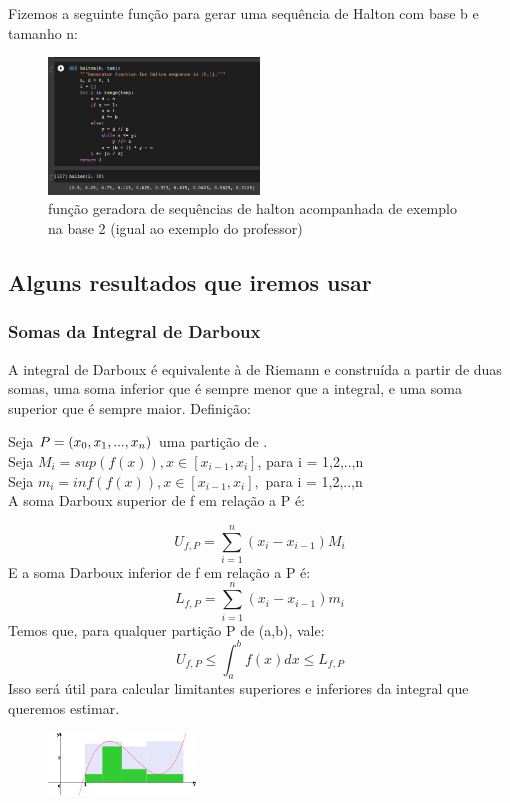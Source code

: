 \documentclass{article}
\begin{document}
Fizemos a seguinte função para gerar uma sequência de Halton com base b e tamanho n:
\begin{figure}[ht]
\centering
\includegraphics[width=0.5\textwidth]{halton_function.png}
\caption{\label{fig:halton_funciton} função geradora de sequências de halton acompanhada de exemplo na base 2 (igual ao exemplo do professor)  }
\end{figure}


\subsection{Alguns resultados que iremos usar}
\subsubsection{Somas da Integral de Darboux}

A integral de Darboux é equivalente à de Riemann e construída a partir de duas somas, uma soma inferior que é sempre menor que a integral, e uma soma superior que é sempre maior. Definição: 

Seja $P = \left(x_0, x_1,..., x_n\right)$ uma partição de . 
\\
Seja $M_i = sup(f(x)), x \in [x_{i-1}, x_i]$, para i = 1,2,..,n \\
Seja $m_i = inf(f(x)), x \in [x_{i-1}, x_i],$ para i = 1,2,..,n \\
A soma Darboux superior de f em relação a P é: 

\[
U_{f,P} = \sum_{i=1}^{n} (x_i - x_{i-1})M_i 
\]
E a soma Darboux inferior de f em relação a P é:
\[
L_{f,P} = \sum_{i=1}^{n} (x_i - x_{i-1})m_i 
\]
Temos que, para qualquer partição P de (a,b), vale:
\[
U_{f,P} \leq \int_{a}^{b} f(x)dx \leq  L_{f,P}
\]
Isso será útil para calcular limitantes superiores e inferiores da integral que queremos estimar.


\begin{figure}[ht]
\centering
\includegraphics[width=0.35\textwidth]{darboux.jpeg}
\end{figure}
\end{document}

